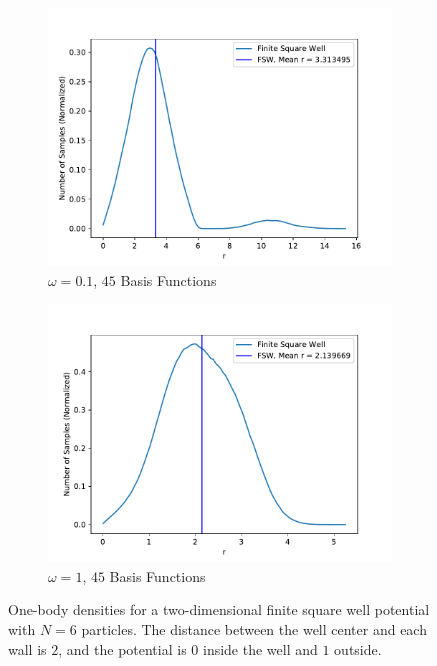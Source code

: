 \documentclass[../main.tex]{subfiles}
\begin{document}
\begin{figure}
\centering
\begin{subfigure}{0.48\textwidth}
\includegraphics[width=\linewidth]{figures/densityFSW/density_FSW_N6_Omega010_2d_BF45.pdf}
\caption{$\omega=0.1$, $45$ Basis Functions} \label{fig:FSW_N6_2d_a}
\end{subfigure}\hspace*{\fill}
\begin{subfigure}{0.48\textwidth}
\includegraphics[width=\linewidth]{figures/densityFSW/density_FSW_N6_Omega1_2d_BF45.pdf}
\caption{$\omega=1$, $45$ Basis Functions} \label{fig:FSW_N6_2d_b}
\end{subfigure}

\caption{One-body densities for a two-dimensional finite square well potential with $N=6$ particles. The distance between the well center and each wall is $2$, and the potential is $0$ inside the well and $1$ outside.} \label{fig:FSW_N6_2d}
\end{figure}
\end{document}

